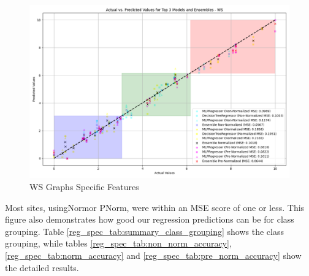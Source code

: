 \documentclass[12pt,letterpaper]{article}
\begin{document}
\begin{figure}[h]
    \centering
    \includegraphics[width=0.95\linewidth]{reg_section_specific/ensemble_learning/actual_vs_predicted_top_3_models_and_ensembles_WS.png}
    \caption{WS Graphs Specific Features}
    \label{reg_spec_fig:ws_ensemble_big}
\end{figure}

Most sites, using\ac{Norm}or \ac{PNorm}, were within an MSE score of one or less.
This figure also demonstrates how good our regression predictions can be for class grouping.
Table \ref{reg_spec_tab:summary_class_grouping} shows the class grouping, while tables \ref{reg_spec_tab:non_norm_accuracy}, \ref{reg_spec_tab:norm_accuracy} and \ref{reg_spec_tab:pre_norm_accuracy} show the detailed results.
\end{document}
